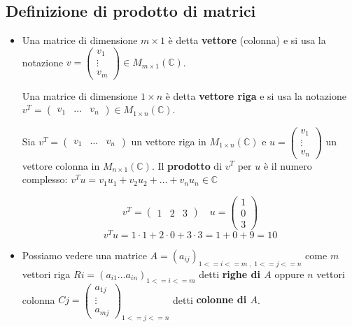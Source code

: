 \documentclass[a4paper]{article}
\theoremstyle{break}
\theoremstyle{break}
\theoremstyle{break}
\theoremstyle{break}
\begin{document}
\subsection{Definizione di prodotto di matrici}
\begin{itemize}
  \item Una matrice di dimensione \( m \times 1 \) è detta \textbf{vettore} (colonna) e
    si usa la notazione \( v = \begin{pmatrix} v_1 \\ \vdots \\ v_m \end{pmatrix} \in M_{m \times 1}(\mathbb{C})  \).

    Una matrice di dimensione \( 1 \times n \) è detta \textbf{vettore riga} e si usa la notazione
    \( v^T = \begin{pmatrix} v_1 & \ldots & v_n \end{pmatrix} \in M_{1 \times n}(\mathbb{C}) \).

    Sia \( v^T = \begin{pmatrix} v_1 & \ldots & v_n \end{pmatrix} \)  un vettore riga
    in \( M_{1 \times n}(\mathbb{C}) \) e \( u = \begin{pmatrix} v_1 \\ \vdots \\ v_n \end{pmatrix} \)
    un vettore colonna in \( M_{n \times 1}(\mathbb{C}) \). Il \textbf{prodotto} di \( v^T \) per \( u \) è
    il numero complesso: \( v^Tu = v_1u_1 + v_2u_2 + \ldots + v_nu_n \in \mathbb{C} \) 

    \begin{example}
      \[
        v^T=\begin{pmatrix} 1 & 2 & 3 \end{pmatrix} \quad u=\begin{pmatrix} 1 \\ 0 \\ 3 \end{pmatrix}
      \] 
      \[
      v^Tu = 1 \cdot 1 + 2 \cdot 0 + 3 \cdot 3 = 1 + 0 + 9 = 10
      \] 
    \end{example}
  \item Possiamo vedere una matrice \( A=(a_{ij})_{1<=i<=m\;,\;1<=j<=n} \)  come \( m \)
    vettori riga \( Ri=(a_{i1} \ldots a_{in})_{1<=i<=m} \) detti \textbf{righe di \( A \)}
    oppure \( n \) vettori colonna \( Cj=\begin{pmatrix} a_{1j} \\ \vdots \\ a_{mj} \end{pmatrix} _{1<=j<=n} \) detti \textbf{colonne di \( A \)}.


\end{itemize}
\end{document}
